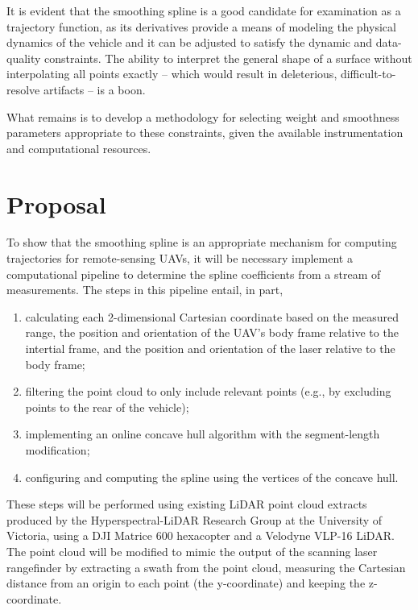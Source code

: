 \documentclass[doc]{apa6}
\begin{document}
It is evident that the smoothing spline is a good candidate for examination as a trajectory function, as its derivatives provide a means of modeling the physical dynamics of the vehicle and it can be adjusted to satisfy the dynamic and data-quality constraints. The ability to interpret the general shape of a surface without interpolating all points exactly -- which would result in deleterious, difficult-to-resolve artifacts -- is a boon.

What remains is to develop a methodology for selecting weight and smoothness parameters appropriate to these constraints, given the available instrumentation and computational resources.

\section{Proposal}

To show that the smoothing spline is an appropriate mechanism for computing trajectories for remote-sensing UAVs, it will be necessary implement a computational pipeline to determine the spline coefficients from a stream of measurements. The steps in this pipeline entail, in part,

\begin{enumerate}
\item calculating each 2-dimensional Cartesian coordinate based on the measured range, the position and  orientation of the UAV's body frame relative to the intertial frame, and the position and orientation of the laser relative to the body frame;
\item filtering the point cloud to only include relevant points (e.g., by excluding points to the rear of the vehicle);
\item implementing an online concave hull algorithm with the segment-length modification;
\item configuring and computing the spline using the vertices of the concave hull.
\end{enumerate}

These steps will be performed using existing LiDAR point cloud extracts produced by the Hyperspectral-LiDAR Research Group at the University of Victoria, using a DJI Matrice 600 hexacopter and a Velodyne VLP-16 LiDAR. The point cloud will be modified to mimic the output of the scanning laser rangefinder by extracting a swath from the point cloud, measuring the Cartesian distance from an origin to each point (the y-coordinate) and keeping the z-coordinate.
\end{document}

